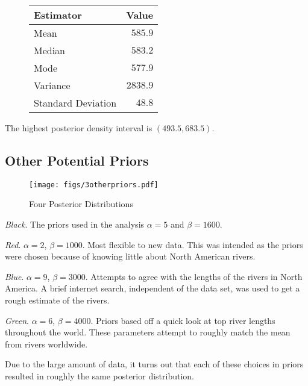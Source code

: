 \documentclass[12pt]{article}
\begin{document}
\begin{figure}[H]
\begin{center}
\begin{tabular}{l|r}
Estimator & \multicolumn{1}{l}{Value} \\ \hline \hline
Mean               & $585.9$ \\
Median             & $583.2$ \\
Mode               & $577.9$ \\
Variance           & $2838.9$ \\
Standard Deviation & $48.8$ \\
\end{tabular}
\end{center}
\end{figure}

\noindent The highest posterior density interval is $(493.5, 683.5)$.

\subsection{Other Potential Priors}

\begin{figure}[H]
\begin{center}
\texttt{[image: figs/3otherpriors.pdf]}
\caption{Four Posterior Distributions}
\end{center}
\end{figure}

\noindent \textit{Black}.  The priors used in the analysis $\alpha=5$ and $\beta=1600$.

\noindent \textit{Red}. $\alpha=2$, $\beta=1000$.  Most flexible to new data.  This was intended as the priors were chosen because of knowing little about North American rivers.

\noindent \textit{Blue}. $\alpha=9$, $\beta=3000$.  Attempts to agree with the lengths of the rivers in North America.  A brief internet search, independent of the data set, was used to get a rough estimate of the rivers.

\noindent \textit{Green}. $\alpha=6$, $\beta=4000$.  Priors based off a quick look at top river lengths throughout the world.  These parameters attempt to roughly match the mean from rivers worldwide.
\bigskip

\noindent Due to the large amount of data, it turns out that each of these choices in priors resulted in roughly the same posterior distribution.
\end{document}
